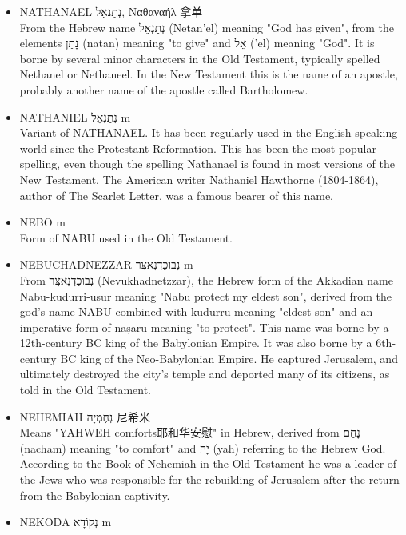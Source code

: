 \begin{itemize}
From the Hebrew name נָתָן (Natan) meaning "he gave他给". In the Old Testament this is the name of a prophet during the reign of King David. He chastised David for his adultery with Bathsheba and for the death of Uriah the Hittite. Later he championed Solomon as David's successor. This was also the name of a son of David and Bathsheba.
\item NATHANAEL נְתַנְאֵל, Ναθαναήλ 拿单 \\
From the Hebrew name נְתַנְאֵל (Netan'el) meaning "God has given", from the elements נָתַן (natan) meaning "to give" and אֵל ('el) meaning "God". It is borne by several minor characters in the Old Testament, typically spelled Nethanel or Nethaneel. In the New Testament this is the name of an apostle, probably another name of the apostle called Bartholomew.
\item NATHANIEL נְתַנְאֵל m\\
Variant of NATHANAEL. It has been regularly used in the English-speaking world since the Protestant Reformation. This has been the most popular spelling, even though the spelling Nathanael is found in most versions of the New Testament. The American writer Nathaniel Hawthorne (1804-1864), author of The Scarlet Letter, was a famous bearer of this name.
\item NEBO m \\
Form of NABU used in the Old Testament.
\item NEBUCHADNEZZAR נְבוּכַדְנֶאצֲּר m \\
From נְבוּכַדְנֶאצֲּר (Nevukhadnetzzar), the Hebrew form of the Akkadian name Nabu-kudurri-usur meaning "Nabu protect my eldest son", derived from the god's name NABU combined with kudurru meaning "eldest son" and an imperative form of naṣāru meaning "to protect". This name was borne by a 12th-century BC king of the Babylonian Empire. It was also borne by a 6th-century BC king of the Neo-Babylonian Empire. He captured Jerusalem, and ultimately destroyed the city's temple and deported many of its citizens, as told in the Old Testament.
\item NEHEMIAH נְחֶמְיָה 尼希米 \\
Means "YAHWEH comforts耶和华安慰" in Hebrew, derived from נָחַם (nacham) meaning "to comfort" and יָה (yah) referring to the Hebrew God. According to the Book of Nehemiah in the Old Testament he was a leader of the Jews who was responsible for the rebuilding of Jerusalem after the return from the Babylonian captivity.
\item NEKODA נְקוֹדָא m \\

\end{itemize}
